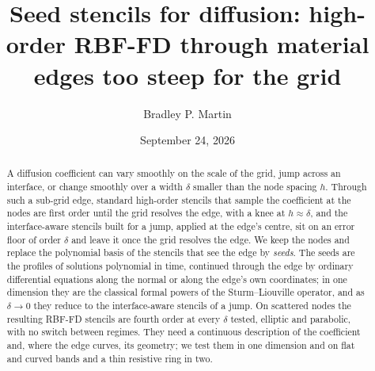 \documentclass[11pt]{amsart}
\title[Seed stencils for diffusion]{Seed stencils for diffusion: high-order
RBF-FD through material edges too steep for the grid}
\author{Bradley P. Martin}
\date{September 24, 2026}
\theoremstyle{definition}
\theoremstyle{remark}
\begin{document}
\begin{abstract}
A diffusion coefficient can vary smoothly on the scale of the grid, jump
across an interface, or change smoothly over a width $\delta$ smaller than
the node spacing $h$. Through such a sub-grid edge, standard high-order
stencils that sample the coefficient at the nodes are first order until the
grid resolves the edge, with a knee at $h \approx \delta$, and the
interface-aware stencils built for a jump, applied at the edge's centre, sit
on an error floor of order $\delta$ and leave it once the grid resolves the
edge. We keep the nodes and replace the polynomial basis of the stencils
that see the edge by \emph{seeds}. The seeds are the profiles of solutions
polynomial in time, continued through the edge by ordinary differential
equations along the normal or along the edge's own coordinates; in one
dimension they are the classical formal powers of the Sturm--Liouville
operator, and as $\delta \to 0$ they reduce to the interface-aware stencils
of a jump. On scattered nodes the resulting RBF-FD stencils are fourth order
at every $\delta$ tested, elliptic and parabolic, with no switch between
regimes. They need a continuous description of the coefficient and, where
the edge curves, its geometry; we test them in one dimension and on flat and
curved bands and a thin resistive ring in two.
\end{abstract}

\maketitle

\end{document}
